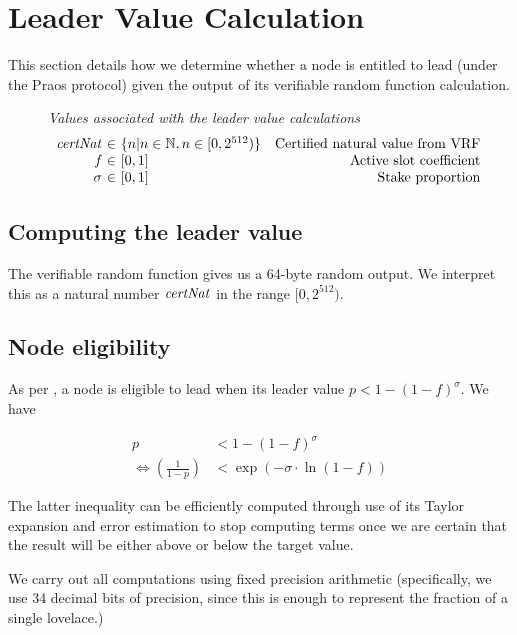 \section{Leader Value Calculation}
\label{sec:leader-value-calc}

This section details how we determine whether a node is entitled to lead (under
the Praos protocol) given the output of its verifiable random function
calculation.

\begin{figure}
  \emph{Values associated with the leader value calculations}
  \begin{equation*}
  \begin{array}{r@{~\in~}lr}
    \var{certNat} & \{n | n \in \N, n \in [0,2^{512})\} & \text{Certified natural value from VRF} \\
    \var{f} & [0,1] & \text{Active slot coefficient} \\
    \sigma & [0,1] & \text{Stake proportion}
  \end{array}
  \end{equation*}
\end{figure}

\subsection{Computing the leader value}

The verifiable random function gives us a 64-byte random output. We interpret
this as a natural number $\mathit{certNat}$ in the range $[0,2^{512})$.

\subsection{Node eligibility}

As per \cite{ouroboros_praos}, a node is eligible to lead when its leader value
$p < 1 - (1 - f)^\sigma$. We have

\begin{align*}
  p & < 1 - (1 -f)^\sigma \\
  \iff \left(\frac{1}{1-p}\right) & < \exp{(-\sigma \cdot \ln{(1-f)})}
\end{align*}

The latter inequality can be efficiently computed through use of its Taylor
expansion and error estimation to stop computing terms once we are certain that
the result will be either above or below the target value.

We carry out all computations using fixed precision arithmetic (specifically, we
use 34 decimal bits of precision, since this is enough to represent the fraction
of a single lovelace.)

